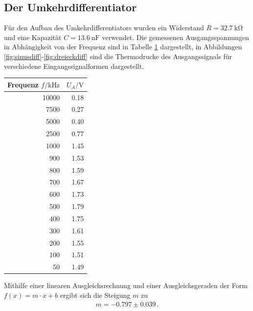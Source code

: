 \documentclass[]{scrartcl}
\begin{document}
\subsection{Der Umkehrdifferentiator}
Für den Aufbau des Umkehrdifferentiators wurden ein Widerstand $R=\SI{32.7}{\kilo\ohm}$ und eine Kapazität $C=\SI{13.6}{\nano\farad}$ verwendet. Die gemessenen Ausgangsspannungen in Abhängigkeit von der Frequenz sind in Tabelle \ref{tab:differentiator} dargestellt, in Abbildungen \ref{fig:sinusdiff}-\ref{fig:dreieckdiff} sind die Thermodrucke des Ausgangssignals für verschiedene Eingangssignalformen dargestellt.
\begin{table}[H]
	\centering
	\label{tab:differentiator}
	\hskip-1.50cm
	\begin{tabular}{r r}
		\toprule
		Frequenz $f / \si{\kilo\hertz}$ & $U_A / \si{\volt}$ \\
		\midrule
		10000 & 0.18 \\
		7500  & 0.27 \\
		5000  & 0.40 \\
		2500  & 0.77 \\
		1000  & 1.45 \\
		900   & 1.53 \\
		800   & 1.59 \\
		700   & 1.67 \\
		600   & 1.73 \\
		500   & 1.79 \\
		400   & 1.75 \\
		300   & 1.61 \\
		200   & 1.55 \\
		100   & 1.51 \\
		50    & 1.49 \\
		\bottomrule
	\end{tabular}
\end{table}
Mithilfe einer linearen Ausgleichsrechnung und einer Ausgleichsgeraden der Form $f(x)=m\cdot x +b$ ergibt sich die Steigung $m$ zu
\begin{align*}
m = -0.797 \pm 0.039\,.
\end{align*}
\end{document}
